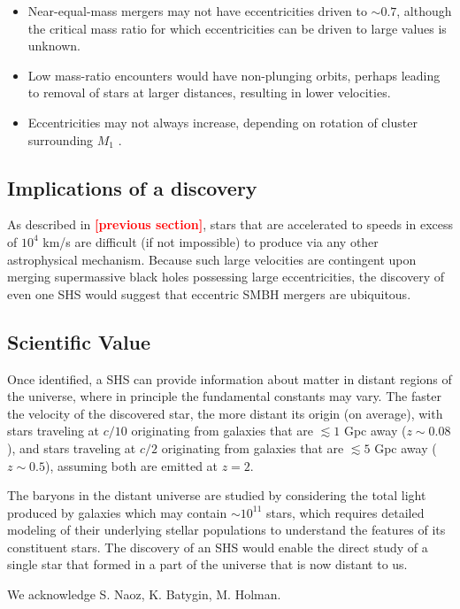 \documentclass[a4paper,twocolumn]{emulateapj}
\newcommand{\colr}[1]{{\bf \textcolor{red}{[#1]}}}
\begin{document}
\begin{itemize}
\item Near-equal-mass mergers may not have eccentricities driven to $\sim 0.7$, although the critical mass ratio for which eccentricities can be driven to large values is unknown.
\item Low mass-ratio encounters would have non-plunging orbits, perhaps leading to removal of stars at larger distances, resulting in lower velocities.
\item Eccentricities may not always increase, depending on rotation of cluster surrounding $M_{1}$ \citep{Dotti:2012bn}.
\end{itemize}

\subsection{Implications of a discovery}
As described in \colr{previous section}, stars that are accelerated to speeds in excess of $10^{4}$ km/s are difficult (if not impossible) to produce via any other astrophysical mechanism. Because such large velocities are contingent upon merging supermassive black holes possessing large eccentricities, the discovery of even one SHS would suggest that eccentric SMBH mergers are ubiquitous.

\subsection{Scientific Value}
Once identified, a SHS can provide information about matter in distant regions of the universe, where in principle the fundamental constants may vary. The faster the velocity of the discovered star, the more distant its origin (on average), with stars traveling at $c/10$ originating from galaxies that are $\lesssim 1$ Gpc away ($z \sim 0.08$), and stars traveling at $c/2$ originating from galaxies that are $\lesssim 5$ Gpc away ($z \sim 0.5$), assuming both are emitted at $z = 2$.

The baryons in the distant universe are studied by considering the total light produced by galaxies which may contain $\sim 10^{11}$ stars, which requires detailed modeling of their underlying stellar populations to understand the features of its constituent stars. The discovery of an SHS would enable the direct study of a single star that formed in a part of the universe that is now distant to us. 

\acknowledgements
We acknowledge S. Naoz, K. Batygin, M. Holman.



\end{document}
